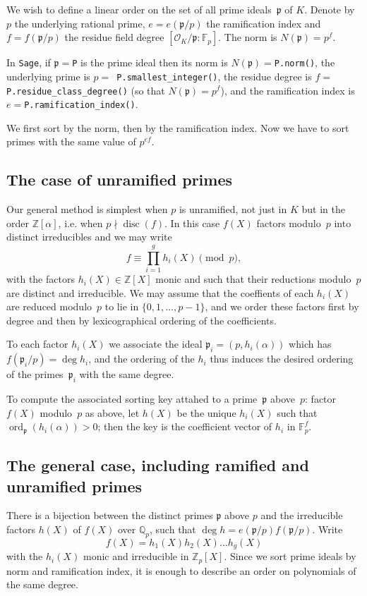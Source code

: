 \documentclass{article}
\def\Sage{{\tt Sage}}
\def\Z{{\mathbb Z}}
\def\Q{{\mathbb Q}}
\def\F{{\mathbb F}}
\def\OO{{\mathcal O}}
\def\p{{\mathfrak p}}
\DeclareMathOperator{\disc}{disc}
\DeclareMathOperator{\ord}{ord}
\begin{document}
We wish to define a linear order on the set of all prime ideals~$\p$
of $K$.  Denote by $p$ the underlying rational prime, $e=e(\p/p)$ the
ramification index and $f=f(\p/p)$ the residue field degree
$[\OO_K/\p:\F_p]$.  The norm is $N(\p)=p^f$.

In \Sage, if $\p=${\tt P} is the prime ideal then its norm is
$N(\p)=${\tt P.norm()}, the underlying prime is $p=${\tt
  P.smallest\_integer()}, the residue degree is $f=${\tt
  P.residue\_class\_degree()} (so that $N(\p)=p^f$), and the
ramification index is $e=${\tt P.ramification\_index()}.

We first sort by the norm, then by the ramification index. Now we have
to sort primes with the same value of $p^{ef}$.

\subsection{The case of unramified primes}

Our general method is simplest when $p$ is unramified, not just in $K$
but in the order $\Z[\alpha]$, i.e. when $p\nmid\disc(f)$.  In this
case $f(X)$ factors modulo~$p$ into distinct irreducibles and we may
write
\[
    f \equiv \prod_{i=1}^{g}h_i(X) \pmod{p},
\]
with the factors $h_i(X)\in\Z[X]$ monic and such that their reductions
modulo~$p$ are distinct and irreducible.  We may assume that the
coeffients of each $h_i(X)$ are reduced modulo~$p$ to lie in
$\{0,1,\dots,p-1\}$, and we order these factors first by degree and
then by lexicographical ordering of the coefficients.

To each factor $h_i(X)$ we associate the ideal $\p_i=(p,h_i(\alpha))$
which has $f(\p_i/p)=\deg h_i$, and the ordering of the $h_i$ thus
induces the desired ordering of the primes~$\p_i$ with the same
degree.

To compute the associated sorting key attahed to a prime~$\p$
above~$p$: factor $f(X)$ modulo~$p$ as above, let $h(X)$ be the unique
$h_i(X)$ such that $\ord_{\p}(h_i(\alpha))>0$; then the key is the
coefficient vector of $h_i$ in $\F_p^f$.

\subsection{The general case, including ramified and unramified primes}

There is a bijection between the distinct primes $\p$ above $p$ and
the irreducible factors $h(X)$ of $f(X)$ over $\Q_p$, such that $\deg h
= e(\p/p)f(\p/p)$.  Write
\[
  f(X) = h_1(X)h_2(X)\dots h_g(X)
\]
with the $h_i(X)$ monic and irreducible in $\Z_p[X]$. Since we sort prime ideals
by norm and ramification index, it is enough to describe an order on polynomials
of the same degree.
\end{document}
